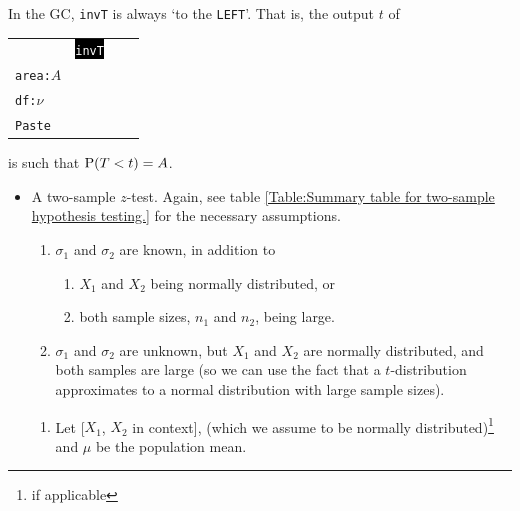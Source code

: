 \documentclass[../Notes.tex]{subfiles}
\begin{document}
\begin{note}
  In the GC, \texttt{invT} is always `to the \texttt{LEFT}'. That is, the output \(t\) of 
  \begin{center}
    \begin{tabular}{|lScr|}
      \hline
      &\qquad\colorbox{black}{\textcolor{white}{\texttt{invT}}}&\\
      \texttt{area:\(A\)}&&\qquad{}\\
      \texttt{df:\(\nu\)}&&\\
      \texttt{Paste}&&\\
      \hline
    \end{tabular}
  \end{center}
  is such that \(\operatorname{P}(T<t)=A\).
\end{note}
\begin{stbox}{}
  \begin{itemize}
    \item A two-sample \(z\)-test. 
    Again, see table \ref{Table:Summary table for two-sample hypothesis testing.} for the necessary assumptions.
    \begin{enumerate}[label=(\roman*)]
      \item \(\sigma_1\) and \(\sigma_2\) are known, in addition to
      \begin{enumerate}[label=(\arabic*)]
        \item \(X_1\) and \(X_2\) being normally distributed, or
        \item both sample sizes, \(n_1\) and \(n_2\), being large.
      \end{enumerate} 
      \item \(\sigma_1\) and \(\sigma_2\) are unknown, but \(X_1\) and \(X_2\) are normally distributed, and both samples are large (so we can use the fact that a \(t\)-distribution approximates to a normal distribution with large sample sizes).
    \end{enumerate}
    \begin{enumerate}
      \item Let [\(X_1\), \(X_2\) in context], (which we assume to be normally distributed)\footnote{if applicable} and \(\mu\) be the population mean.

\end{enumerate}
\end{itemize}
\end{stbox}
\end{document}
